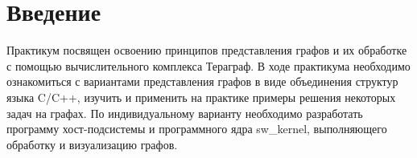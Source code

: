 \section*{Введение}
{}
Практикум посвящен освоению принципов представления графов и их обработке с помощью вычислительного комплекса Тераграф. В ходе практикума необходимо ознакомиться с вариантами представления графов в виде объединения структур языка C/C++, изучить и применить на практике примеры решения некоторых задач на графах. По индивидуальному варианту необходимо разработать программу хост-подсистемы и программного ядра sw\_kernel, выполняющего обработку и визуализацию графов.
\newpage